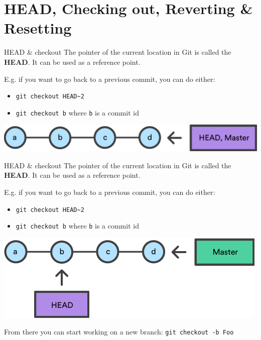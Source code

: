 \documentclass[usenames,dvipsnames,9pt]{beamer}
\begin{document}
\section{HEAD, Checking out, Reverting \& Resetting}

%
\begin{frame}[t]{HEAD \& checkout}
  \vspace{0.5cm}
  The pointer of the current location in Git is called the \textbf{HEAD}.
  It can be used as a reference point.

  E.g. if you want to go back to a previous commit, you can do either:
  \begin{itemize}
    \item \lstinline|git checkout HEAD~2|
    \item \lstinline|git checkout b| where \lstinline|b| is a commit id
  \end{itemize}

  \vspace{0.53cm}
  \includegraphics[scale=1.5]{img/undoing/git-sequence-transparent.png}
\end{frame}

%
\begin{frame}[t]{HEAD \& checkout}
  \vspace{0.5cm}
  The pointer of the current location in Git is called the \textbf{HEAD}.
  It can be used as a reference point.

  E.g. if you want to go back to a previous commit, you can do either:
  \begin{itemize}
    \item \lstinline|git checkout HEAD~2|
    \item \lstinline|git checkout b| where \lstinline|b| is a commit id
  \end{itemize}

  \vspace{0.5cm}
  \includegraphics[scale=1.5]{img/undoing/2497537634-git-checkout-transparent.png}

  From there you can start working on a new branch: \lstinline|git checkout -b Foo|
\end{frame}
\end{document}
